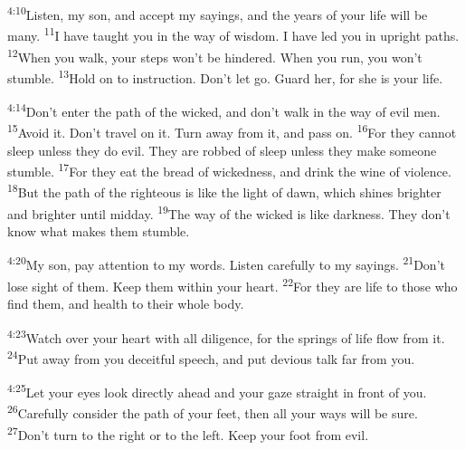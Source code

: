 \documentclass[openany,12pt,english]{book}
\newenvironment{para}{\par\pretolerance=100\tolerance=200\setlength{\emergencystretch}{0.6em}\relax}{\par}
\begin{document}
\begin{para}
    \textsuperscript{4:10}\thinspace{}Lis\-ten, my son, and ac\-cept my sayings, and the years of your life will be man\-y.
    \textsuperscript{11}\thinspace{}I have taught you in the way of wis\-dom. I have led you in up\-right paths.
    \textsuperscript{12}\thinspace{}When you walk, your steps won't be hindered. When you run, you won't stum\-ble.
    \textsuperscript{13}\thinspace{}Hold on to in\-struc\-tion. Don't let go. Guard her, for she is your life.
\end{para}

\begin{para}
    \textsuperscript{4:14}\thinspace{}Don't en\-ter the path of the wick\-ed, and don't walk in the way of evil men.
    \textsuperscript{15}\thinspace{}A\-void it. Don't trav\-el on it. Turn a\-way from it, and pass on.
    \textsuperscript{16}\thinspace{}For they can\-not sleep un\-less they do evil. They are robbed of sleep un\-less they make some\-one stum\-ble.
    \textsuperscript{17}\thinspace{}For they eat the bread of wick\-ed\-ness, and drink the wine of vi\-o\-lence.
    \textsuperscript{18}\thinspace{}But the path of the right\-eous is like the light of dawn, which shines brighter and brighter un\-til mid\-day.
    \textsuperscript{19}\thinspace{}The way of the wick\-ed is like dark\-ness. They don't know what makes them stum\-ble.
\end{para}

\begin{para}
    \textsuperscript{4:20}\thinspace{}My son, pay at\-ten\-tion to my words. Lis\-ten care\-ful\-ly to my sayings.
    \textsuperscript{21}\thinspace{}Don't lose sight of them. Keep them with\-in your heart.
    \textsuperscript{22}\thinspace{}For they are life to those who find them, and health to their whole bod\-y.
\end{para}

\begin{para}
    \textsuperscript{4:23}\thinspace{}Watch over your heart with all dil\-i\-gence, for the springs of life flow from it.
    \textsuperscript{24}\thinspace{}Put a\-way from you de\-ceit\-ful speech, and put de\-vi\-ous talk far from you.
\end{para}

\begin{para}
    \textsuperscript{4:25}\thinspace{}Let your eyes look di\-rect\-ly a\-head and your gaze straight in front of you.
    \textsuperscript{26}\thinspace{}Care\-ful\-ly con\-sid\-er the path of your feet, then all your ways will be sure.
    \textsuperscript{27}\thinspace{}Don't turn to the right or to the left. Keep your foot from evil.
\end{para}
\end{document}

